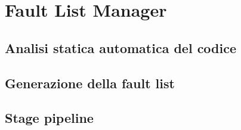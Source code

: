 \section{Fault List Manager}

\subsection{Analisi statica automatica del codice}

\subsection{Generazione della fault list}

\subsection{Stage pipeline}